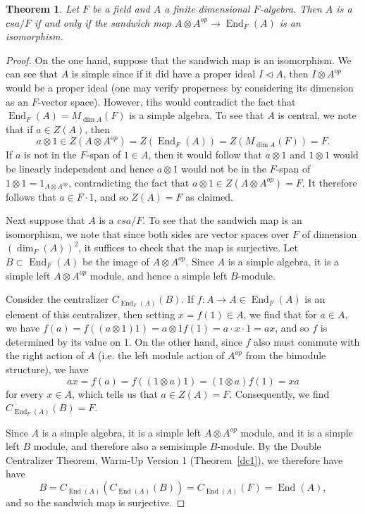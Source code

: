\documentclass[12pt]{report}
\theoremstyle{plain}
\newtheorem{thm}{Theorem}[section]
\newcommand{\oper}[1]{\operatorname{#1}}
\newcommand{\End}{\oper{End}}
\begin{document}
\begin{thm} \label{sandwich csa}
Let $F$ be a field and $A$ a finite dimensional $F$-algebra. Then $A$ is a
$csa/F$ if and only if the sandwich map $A \otimes A^{op} \to \End_F(A)$ is
an isomorphism.
\end{thm}
\begin{proof}
On the one hand, suppose that the sandwich map is an isomorphism. We can
see that $A$ is simple since if it did have a proper ideal $I \triangleleft A$,
then $I \otimes A^{op}$ would be a proper ideal (one may verify properness
by considering its dimension as an $F$-vector space). However, tihs would
contradict the fact that  $\End_F(A) = M_{\dim A}(F)$ is a simple algebra.
To see that $A$ is central, we note that if $a \in Z(A)$, then 
\[a \otimes 1 \in Z(A \otimes A^{op}) = Z(\End_F(A)) = Z(M_{\dim A}(F)) =
F.\]
If $a$ is not in the $F$-span of $1 \in A$, then it would follow that $a
\otimes 1$ and $1 \otimes 1$ would be linearly independent and hence $a
\otimes 1$ would not be in the $F$-span of $1 \otimes 1 = 1_{A \otimes
A^{op}}$, contradicting the fact that $a \otimes 1 \in Z(A \otimes A^{op})
= F$. It therefore follows that $a \in F \cdot 1$, and so $Z(A) = F$ as
claimed.

Next suppose that $A$ is a $csa/F$. To see that the sandwich map is an
isomorphism, we note that since both sides are vector spaces over $F$ of
dimension $\left(\dim_F(A)\right)^2$, it suffices to check that the map is
surjective. Let $B \subset \End_F(A)$ be the image of $A \otimes A^{op}$.
Since $A$ is a simple algebra, it is a simple left $A \otimes A^{op}$
module, and hence a simple left $B$-module. 

Consider the centralizer $C_{\End_F(A)}(B)$. If $f: A \to A \in \End_F(A)$
is an element of this centralizer, then setting $x = f(1) \in A$, we find
that for $a \in A$, we have $f(a) = f((a \otimes 1) 1) = a \otimes 1 f(1) =
a \cdot x \cdot 1 = ax$, and so $f$ is determined by its value on $1$. On
the other hand, since $f$ also must commute with the right action of $A$
(i.e. the left module action of $A^{op}$ from the bimodule structure), we
have
\[ ax = f(a) = f((1 \otimes a) 1) = (1 \otimes a) f(1) = xa \]
for every $x \in A$, which tells us that $a \in Z(A) = F$. Consequently, we
find $C_{\End_F(A)}(B) = F$.

Since $A$ is a simple algebra, it is a simple left $A \otimes A^{op}$ module,
and it is a simple left $B$ module, and therefore also a semisimple
$B$-module. By the Double Centralizer Theorem, Warm-Up Version 1
(Theorem~\ref{dc1}), we therefore have have
\[B = C_{\End(A)}(C_{\End(A)}(B)) = C_{\End(A)}(F) = \End(A), \]
and so the sandwich map is surjective.
\end{proof}
\end{document}
